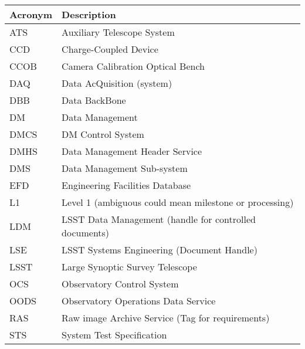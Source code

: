 \addtocounter{table}{-1}
\begin{longtable}{|l|p{}|}\hline
\textbf{Acronym} & \textbf{Description}  \\\hline

ATS & Auxiliary Telescope System \\\hline
CCD & Charge-Coupled Device \\\hline
CCOB & Camera Calibration Optical Bench \\\hline
DAQ & Data AcQuisition (system) \\\hline
DBB & Data BackBone \\\hline
DM & Data Management \\\hline
DMCS & DM Control System \\\hline
DMHS & Data Management Header Service \\\hline
DMS & Data Management Sub-system \\\hline
EFD & Engineering Facilities Database \\\hline
L1 & Level 1 (ambiguous could mean milestone or processing) \\\hline
LDM & LSST Data Management (handle for controlled documents) \\\hline
LSE & LSST Systems Engineering (Document Handle) \\\hline
LSST & Large Synoptic Survey Telescope \\\hline
OCS & Observatory Control System \\\hline
OODS & Observatory Operations Data Service \\\hline
RAS & Raw image Archive Service (Tag for requirements) \\\hline
STS & System Test Specification \\\hline
\end{longtable}
